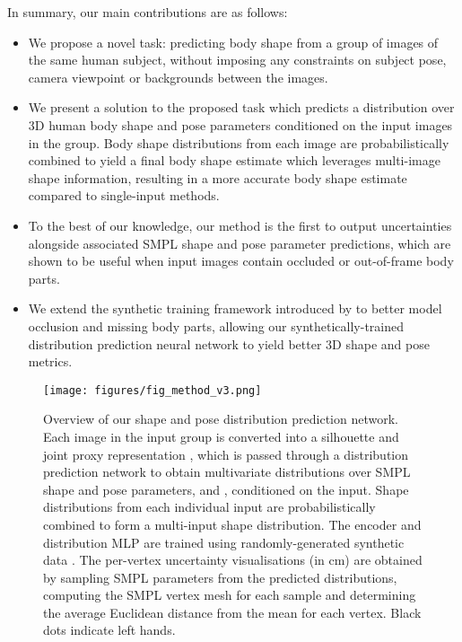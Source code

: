 \documentclass[final]{cvpr}
\begin{document}
In summary, our main contributions are as follows:
\begin{itemize}
    \item We propose a novel task: predicting body shape from a group of images of the same human subject, without imposing any constraints on subject pose, camera viewpoint or backgrounds between the images.
    \item We present a solution to the proposed task which predicts a distribution over 3D human body shape and pose parameters conditioned on the input images in the group. Body shape distributions from each image are probabilistically combined to yield a final body shape estimate which leverages multi-image shape information, resulting in a more accurate body shape estimate compared to single-input methods.
    \item To the best of our knowledge, our method is the first to output uncertainties alongside associated SMPL \cite{SMPL:2015} shape and pose parameter predictions, which are shown to be useful when input images contain occluded or out-of-frame body parts.
    \item We extend the synthetic training framework introduced by \cite{STRAPS2020BMVC} to better model occlusion and missing body parts, allowing our synthetically-trained distribution prediction neural network to yield better 3D shape and pose metrics.
\end{itemize}

\begin{figure*}[t]
    \centering
    \texttt{[image: figures/fig\_method\_v3.png]}
    \caption{Overview of our shape and pose distribution prediction network. Each image  in the input group is converted into a silhouette and joint proxy representation , which is passed through a distribution prediction network to obtain multivariate distributions over SMPL \cite{SMPL:2015} shape and pose parameters,  and , conditioned on the input. Shape distributions from each individual input are probabilistically combined to form a multi-input shape distribution. The encoder and distribution MLP are trained using randomly-generated synthetic data \cite{STRAPS2020BMVC}. The per-vertex uncertainty visualisations (in cm) are obtained by sampling SMPL parameters from the predicted distributions, computing the SMPL vertex mesh for each sample and determining the average Euclidean distance from the mean for each vertex. Black dots indicate left hands.}
    \label{fig:method}
    \vspace{-0.3cm}
\end{figure*}
\end{document}
